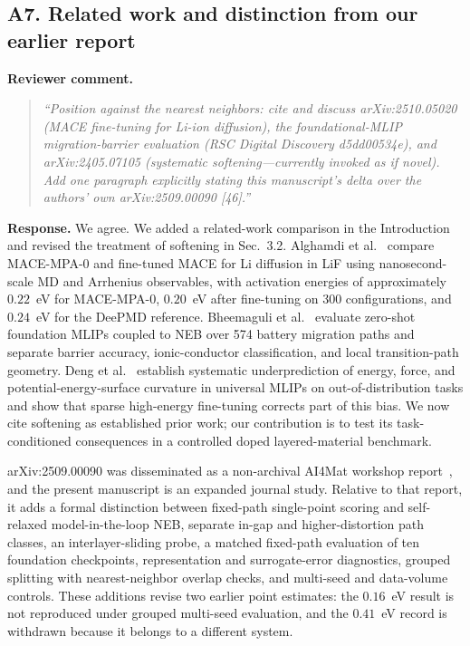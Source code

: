 \documentclass[11pt,a4paper]{article}
\begin{document}
\subsection*{A7. Related work and distinction from our earlier report}

\noindent\textbf{Reviewer comment.}
\begin{quote}
\itshape
``Position against the nearest neighbors: cite and discuss arXiv:2510.05020 (MACE fine-tuning for Li-ion diffusion), the foundational-MLIP migration-barrier evaluation (RSC Digital Discovery d5dd00534e), and arXiv:2405.07105 (systematic softening---currently invoked as if novel). Add one paragraph explicitly stating this manuscript's delta over the authors' own arXiv:2509.00090 [46].''
\end{quote}

\noindent\textbf{Response.}
We agree. We added a related-work comparison in the Introduction and revised the treatment of softening in Sec.~3.2. Alghamdi et al.~\citep{alghamdi2025maceLiF} compare MACE-MPA-0 and fine-tuned MACE for Li diffusion in LiF using nanosecond-scale MD and Arrhenius observables, with activation energies of approximately $0.22$~eV for MACE-MPA-0, $0.20$~eV after fine-tuning on 300 configurations, and $0.24$~eV for the DeePMD reference. Bheemaguli et al.~\citep{bheemaguli2026mlipBarriers} evaluate zero-shot foundation MLIPs coupled to NEB over 574 battery migration paths and separate barrier accuracy, ionic-conductor classification, and local transition-path geometry. Deng et al.~\citep{deng2025softening} establish systematic underprediction of energy, force, and potential-energy-surface curvature in universal MLIPs on out-of-distribution tasks and show that sparse high-energy fine-tuning corrects part of this bias. We now cite softening as established prior work; our contribution is to test its task-conditioned consequences in a controlled doped layered-material benchmark.

arXiv:2509.00090 was disseminated as a non-archival AI4Mat workshop report~\citep{cao2025migration}, and the present manuscript is an expanded journal study. Relative to that report, it adds a formal distinction between fixed-path single-point scoring and self-relaxed model-in-the-loop NEB, separate in-gap and higher-distortion path classes, an interlayer-sliding probe, a matched fixed-path evaluation of ten foundation checkpoints, representation and surrogate-error diagnostics, grouped splitting with nearest-neighbor overlap checks, and multi-seed and data-volume controls. These additions revise two earlier point estimates: the $0.16$~eV result is not reproduced under grouped multi-seed evaluation, and the $0.41$~eV record is withdrawn because it belongs to a different system.
\end{document}
